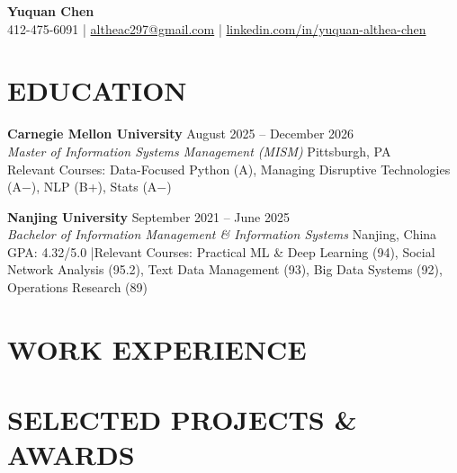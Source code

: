 \documentclass[letterpaper,11pt]{article}
\begin{document}
\begin{center}
  {\fontsize{18}{20}\selectfont\bfseries\sffamily Yuquan Chen}\\[1pt]
  \small
  412-475-6091 \;|\;
  \href{mailto:altheac297@gmail.com}{altheac297@gmail.com} \;|\;
  \href{https://www.linkedin.com/in/yuquan-althea-chen/}{linkedin.com/in/yuquan-althea-chen}
\end{center}

\section{EDUCATION}

{\textbf{Carnegie Mellon University} \hfill August 2025 -- December 2026}\\[-2pt]
{\textit{Master of Information Systems Management (MISM)} \hfill Pittsburgh, PA}\\[1pt]
{\small Relevant Courses: Data-Focused Python (A), Managing Disruptive Technologies (A$-$), NLP (B+), Stats (A$-$)}\par

\vspace{1pt}

{\textbf{Nanjing University} \hfill September 2021 -- June 2025}\\[-2pt]
{\textit{Bachelor of Information Management \& Information Systems} \hfill Nanjing, China}\\[1pt]
{\small GPA: 4.32/5.0 \quad|\quad Relevant Courses: Practical ML \& Deep Learning (94), Social Network Analysis (95.2), Text Data Management (93), Big Data Systems (92), Operations Research (89)}\par

\section{WORK EXPERIENCE}


\section{SELECTED PROJECTS \& AWARDS}

\end{document}
